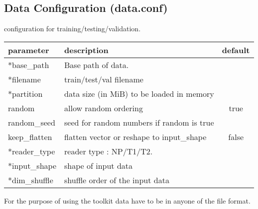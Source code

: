 \subsection{Data Configuration (data.conf)}
\begin{table}[h]
\begin{center}
  \medskip  \small configuration for training/testing/validation.
   \begin{tabular}{|l|p{8cm}|c|} \hline
   	\textbf{parameter} & \textbf{description} & \textbf{default}\\  \hline
 	*base\_path & Base path of data. &  \\  \hline
   	*filename &  train/test/val filename & \\  \hline
	*partition & data size (in MiB) to be loaded in memory & \\  \hline
	random & allow random ordering  & true \\  \hline
	random\_seed & seed for random numbers if random is true & \\  \hline 
	keep\_flatten & flatten vector or reshape to input\_shape & false \\  \hline
	*reader\_type & reader type : NP/T1/T2. & \\  \hline		
	*input\_shape & shape of input data & \\  \hline
	*dim\_shuffle &  shuffle order of the input data &  \\ \hline
  \end{tabular}		
\end{center}
\end{table} 
\noindent For the purpose of using the toolkit data have to be in anyone of the file format.

